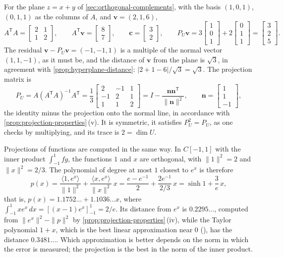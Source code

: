 For the plane $z=x+y$ of \cref{sec:orthogonal-complements}, with the basis $(1,0,1)$, $(0,1,1)$ as the columns of $A$, and $\mathbf v=(2,1,6)$,
\[
A^{\mathsf T}A=\begin{bmatrix}2&1\\1&2\end{bmatrix},\qquad A^{\mathsf T}\mathbf v=\begin{bmatrix}8\\7\end{bmatrix},\qquad\mathbf c=\begin{bmatrix}3\\2\end{bmatrix},\qquad P_U\mathbf v=3\begin{bmatrix}1\\0\\1\end{bmatrix}+2\begin{bmatrix}0\\1\\1\end{bmatrix}=\begin{bmatrix}3\\2\\5\end{bmatrix}.
\]
The residual $\mathbf v-P_U\mathbf v=(-1,-1,1)$ is a multiple of the normal vector $(1,1,-1)$, as it must be, and the distance of $\mathbf v$ from the plane is $\sqrt3$, in agreement with \cref{prop:hyperplane-distance}: $|2+1-6|/\sqrt3=\sqrt3$. The projection matrix is
\[
P_U=A(A^{\mathsf T}A)^{-1}A^{\mathsf T}=\frac13\begin{bmatrix}2&-1&1\\-1&2&1\\1&1&2\end{bmatrix}=I-\frac{\mathbf n\mathbf n^{\mathsf T}}{\|\mathbf n\|^2},\qquad\mathbf n=\begin{bmatrix}1\\1\\-1\end{bmatrix},
\]
the identity minus the projection onto the normal line, in accordance with \cref{prop:projection-properties}\,(v). It is symmetric, it satisfies $P_U^2=P_U$, as one checks by multiplying, and its trace is $2=\dim U$.

Projections of functions are computed in the same way. In $C[-1,1]$ with the inner product $\int_{-1}^1fg$, the functions $1$ and $x$ are orthogonal, with $\|1\|^2=2$ and $\|x\|^2=2/3$. The polynomial of degree at most $1$ closest to $e^x$ is therefore
\[
p(x)=\frac{\langle1,e^x\rangle}{\|1\|^2}+\frac{\langle x,e^x\rangle}{\|x\|^2}\,x=\frac{e-e^{-1}}2+\frac{2e^{-1}}{2/3}\,x=\sinh1+\frac3e\,x ,
\]
that is, $p(x)=1.1752\ldots+1.1036\ldots x$,
where $\int_{-1}^1xe^x\,dx=[(x-1)e^x]_{-1}^1=2/e$. Its distance from $e^x$ is $0.2295\ldots$, computed from $\|e^x\|^2-\|p\|^2$ by \cref{prop:projection-properties}\,(iv), while the Taylor polynomial $1+x$, which is the best linear approximation near $0$ (), has the distance $0.3481\ldots$. Which approximation is better depends on the norm in which the error is measured; the projection is the best in the norm of the inner product.

